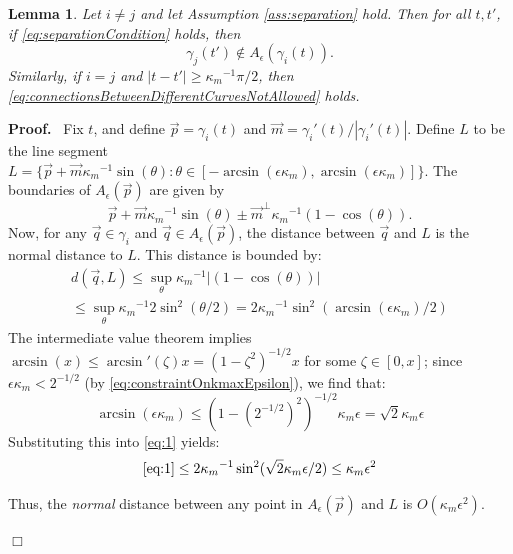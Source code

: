 \documentclass{article}
\newcommand{\nin}{\not\in}
\newenvironment{proof}{
  \noindent\textbf{Proof.}\ }{\hspace*{\fill}
  \begin{math}\Box\end{math}\medskip}
\newtheorem{lemma}[cntr]{Lemma}
\numberwithin{cntr}{section}
\numberwithin{equation}{section}
\newcommand{\abs}[1]{\left| #1 \right|}%
\newcommand{\vp}[0]{{\vec{p}}}
\newcommand{\vq}[0]{{\vec{q}}}
\newcommand{\vm}[0]{{\vec{m}}}
\newcommand{\allowed}[2]{ { A_{#1}(#2) } }
\newcommand{\curvemax}{{\kappa_{m}}}
\newcommand{\curvemaxi}{{\curvemax^{-1}}}
\begin{document}
\begin{lemma}
  \label{lem:separationAllowedRegions}
  Let $i \neq j$ and let Assumption \ref{ass:separation} hold. Then for all $t, t'$, if \eqref{eq:separationCondition} holds, then
  \begin{equation}
    \label{eq:connectionsBetweenDifferentCurvesNotAllowed}
    \gamma_{j}(t')  \nin  \allowed{\epsilon}{\gamma_{i}(t)}.
  \end{equation}
  Similarly, if $i=j$ and $\abs{t-t'} \geq \curvemax^{-1} \pi/2$, then \eqref{eq:connectionsBetweenDifferentCurvesNotAllowed} holds.
\end{lemma}
\begin{proof}
  Fix $t$, and define $\vp=\gamma_{i}(t)$ and $\vm=\gamma_{i}'(t) / \abs{\gamma_{i}'(t)}$. Define $L$ to be the line segment $L= \{ \vp+\vm \curvemaxi \sin(\theta) : \theta \in [-\arcsin(\epsilon \curvemax),\arcsin(\epsilon \curvemax)] \}$. The boundaries of $\allowed{\epsilon}{\vp}$ are given by
\begin{equation*}
  \vp + \vm \curvemaxi \sin(\theta) \pm \vm^{\perp} \curvemaxi (1-\cos(\theta)).
\end{equation*}
Now, for any $\vq \in \gamma_{i} $ and $\vq \in \allowed{\epsilon}{\vp}$, the distance between $\vq$ and $L$ is the normal distance to $L$. This distance is bounded by:
\begin{multline}
  \label{eq:1}
  d(\vq,L) \leq
  \sup_{\theta} \curvemaxi \abs{(1-\cos(\theta)) }\\
  \leq
  \sup_{\theta} \curvemaxi 2 \sin^{2}(\theta/2) =
  2\curvemaxi \sin^{2}( \arcsin(\epsilon \curvemax)/2)
\end{multline}
The intermediate value theorem implies $\arcsin( x) \leq \arcsin'(\zeta) x=(1-\zeta^{2})^{-1/2} x$ for some $\zeta \in [0,x]$; since $\epsilon \curvemax < 2^{-1/2}$ (by \eqref{eq:constraintOnkmaxEpsilon}), we find that:
\begin{equation*}
  \arcsin(\epsilon \curvemax) \leq (1-(2^{-1/2})^{2})^{-1/2} \curvemax \epsilon = \sqrt{2} \curvemax \epsilon
\end{equation*}
Substituting this into \eqref{eq:1} yields:
\begin{equation}
  \label{eq:4}
  \eqref{eq:1} \leq  2 \curvemaxi \sin^{2}( \sqrt{2} \curvemax \epsilon/2) \leq \curvemax \epsilon^{2}
\end{equation}

Thus, the \emph{normal} distance between any point in $\allowed{\epsilon}{\vp}$ and $L$ is $O(\curvemax \epsilon^{2})$.


\end{proof}
\end{document}
